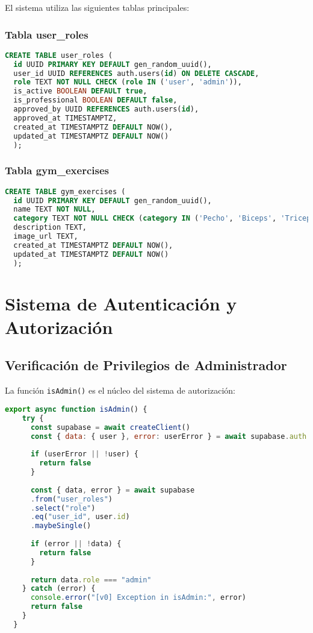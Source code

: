 \documentclass[12pt,a4paper]{article}
\begin{document}
El sistema utiliza las siguientes tablas principales:

\subsubsection{Tabla user\_roles}
\begin{lstlisting}[language=SQL, caption=Estructura de la tabla user\_roles]
  CREATE TABLE user_roles (
  id UUID PRIMARY KEY DEFAULT gen_random_uuid(),
  user_id UUID REFERENCES auth.users(id) ON DELETE CASCADE,
  role TEXT NOT NULL CHECK (role IN ('user', 'admin')),
  is_active BOOLEAN DEFAULT true,
  is_professional BOOLEAN DEFAULT false,
  approved_by UUID REFERENCES auth.users(id),
  approved_at TIMESTAMPTZ,
  created_at TIMESTAMPTZ DEFAULT NOW(),
  updated_at TIMESTAMPTZ DEFAULT NOW()
  );
\end{lstlisting}

\subsubsection{Tabla gym\_exercises}
\begin{lstlisting}[language=SQL, caption=Estructura de la tabla gym\_exercises]
  CREATE TABLE gym_exercises (
  id UUID PRIMARY KEY DEFAULT gen_random_uuid(),
  name TEXT NOT NULL,
  category TEXT NOT NULL CHECK (category IN ('Pecho', 'Biceps', 'Triceps', 'Hombros', 'Pierna', 'Espalda', 'Otros')),
  description TEXT,
  image_url TEXT,
  created_at TIMESTAMPTZ DEFAULT NOW(),
  updated_at TIMESTAMPTZ DEFAULT NOW()
  );
\end{lstlisting}

\section{Sistema de Autenticación y Autorización}

\subsection{Verificación de Privilegios de Administrador}

La función \texttt{isAdmin()} es el núcleo del sistema de autorización:

\begin{lstlisting}[language=JavaScript, caption=Función isAdmin en admin-actions.ts]
  export async function isAdmin() {
    try {
      const supabase = await createClient()
      const { data: { user }, error: userError } = await supabase.auth.getUser()
      
      if (userError || !user) {
        return false
      }
      
      const { data, error } = await supabase
      .from("user_roles")
      .select("role")
      .eq("user_id", user.id)
      .maybeSingle()
      
      if (error || !data) {
        return false
      }
      
      return data.role === "admin"
    } catch (error) {
      console.error("[v0] Exception in isAdmin:", error)
      return false
    }
  }
\end{lstlisting}
\end{document}
